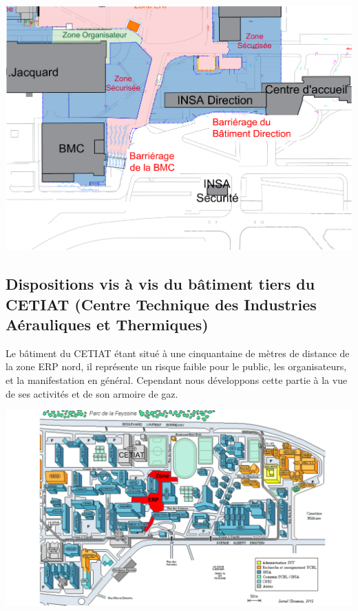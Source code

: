 \documentclass[hidelinks, paper=a4, fontsize=13pt]{report}
\begin{document}
\begin{center}
	\includegraphics[width=.8\textwidth,keepaspectratio]{Exports/Plan_24h_44eme-Protection_Bat}
\end{center}

\subsection{Dispositions vis à vis du bâtiment tiers du CETIAT (Centre Technique des Industries Aérauliques et Thermiques)}

Le bâtiment du CETIAT étant situé à une cinquantaine de mètres de distance de la zone ERP nord, il représente un risque faible pour le public, les organisateurs, et la manifestation en général. Cependant nous développons cette partie à la vue de ses activités et de son armoire de gaz. 

\begin{center}
	\includegraphics[scale=0.9]{Annexes/Plans/Emplacement_CETIAT}
\end{center}
\end{document}
